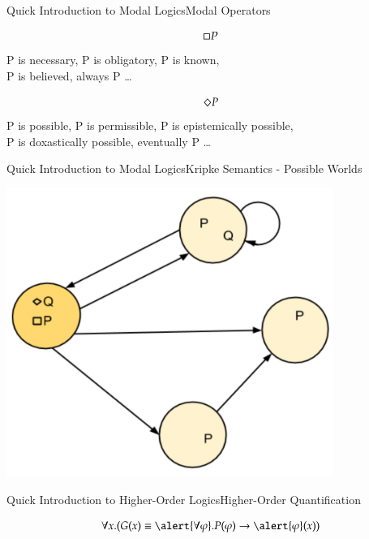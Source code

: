 

\begin{frame}{Quick Introduction to Modal Logics}{Modal Operators} \large
\centering 

$$\Box P$$
P is necessary, P is obligatory, P is known, \\ 
P is believed, always P \ldots

\bigskip
\pause

$$\Diamond P$$
P is possible, P is permissible, P is epistemically possible, \\ 
P is doxastically possible, eventually P \ldots

\end{frame}


\begin{frame}{Quick Introduction to Modal Logics}{Kripke Semantics - Possible Worlds} \large

\includegraphics[width=0.8\textwidth]{Images/Kripke}

\end{frame}


\begin{frame}{Quick Introduction to Higher-Order Logics}{Higher-Order Quantification} \large

\begin{Huge}
$$
\forall x. (G(x) \equiv \alert{\forall \varphi}. P(\varphi) \imp \alert{\varphi}(x))
$$
\end{Huge}

\end{frame}


